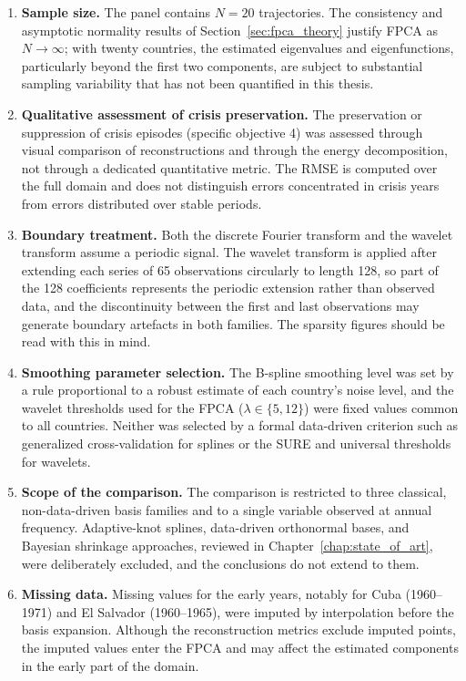 \begin{enumerate}
    \item \textbf{Sample size.} The panel contains $N = 20$ trajectories.
    The consistency and asymptotic normality results of
    Section~\ref{sec:fpca_theory} justify FPCA as $N \to \infty$; with
    twenty countries, the estimated eigenvalues and eigenfunctions,
    particularly beyond the first two components, are subject to
    substantial sampling variability that has not been quantified in
    this thesis.

    \item \textbf{Qualitative assessment of crisis preservation.} The
    preservation or suppression of crisis episodes (specific objective 4)
    was assessed through visual comparison of reconstructions and through
    the energy decomposition, not through a dedicated quantitative metric.
    The RMSE is computed over the full domain and does not distinguish
    errors concentrated in crisis years from errors distributed over
    stable periods.

    \item \textbf{Boundary treatment.} Both the discrete Fourier
    transform and the wavelet transform assume a periodic signal. The
    wavelet transform is applied after extending each series of 65
    observations circularly to length 128, so part of the 128
    coefficients represents the periodic extension rather than observed
    data, and the discontinuity between the first and last observations
    may generate boundary artefacts in both families. The sparsity
    figures should be read with this in mind.

    \item \textbf{Smoothing parameter selection.} The B-spline smoothing
    level was set by a rule proportional to a robust estimate of each
    country's noise level, and the wavelet thresholds used for the FPCA
    ($\lambda \in \{5, 12\}$) were fixed values common to all countries.
    Neither was selected by a formal data-driven criterion such as
    generalized cross-validation for splines or the SURE and universal
    thresholds for wavelets.

    \item \textbf{Scope of the comparison.} The comparison is restricted
    to three classical, non-data-driven basis families and to a single
    variable observed at annual frequency. Adaptive-knot splines,
    data-driven orthonormal bases, and Bayesian shrinkage approaches,
    reviewed in Chapter~\ref{chap:state_of_art}, were deliberately
    excluded, and the conclusions do not extend to them.

    \item \textbf{Missing data.} Missing values for the early years,
    notably for Cuba (1960--1971) and El Salvador (1960--1965), were
    imputed by interpolation before the basis expansion. Although the
    reconstruction metrics exclude imputed points, the imputed values
    enter the FPCA and may affect the estimated components in the early
    part of the domain.
\end{enumerate}

